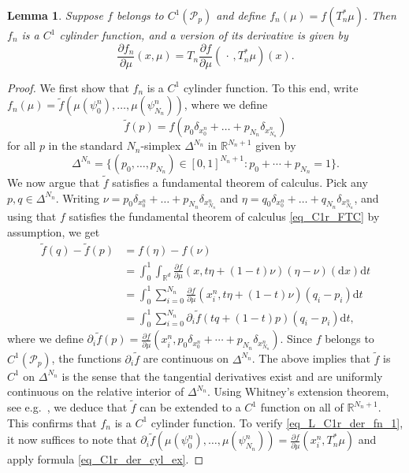 \documentclass{article}
\newtheorem{lemma}[theorem]{Lemma}
\theoremstyle{definition}
\numberwithin{equation}{section}
\numberwithin{theorem}{section}
\newcommand{\R}{\mathbb{R}}
\newcommand{\dx}{\mathrm{d}x}
\newcommand{\dt}{\mathrm{d}t}
\newcommand{\Pcal}{{\mathcal P}}
\newcommand{\fdot}{{\,\cdot\,}}
\begin{document}
\begin{lemma}\label{L_C1r_der_fn}
Suppose $f$ belongs to $C^1(\Pcal_p)$ and define $f_n(\mu)=f(T_n^*\mu)$. Then $f_n$ is a $C^1$ cylinder function, and a version of its derivative is given by
\begin{equation}\label{eq_L_C1r_der_fn_1}
\frac{\partial f_n}{\partial\mu}(x,\mu) = T_n \frac{\partial f}{\partial\mu}(\fdot,T_n^*\mu)(x).
\end{equation}
\end{lemma}

\begin{proof}
We first show that $f_n$ is a $C^1$ cylinder function. To this end, write $f_n(\mu) = \tilde f(\mu(\psi^n_0),\ldots,\mu(\psi^n_{N_n}))$, where we define
\begin{equation}\label{eq_L_C1r_der_fn_ftilde}
\tilde f(p) = f(p_0\delta_{x^n_0} + \ldots + p_{N_n}\delta_{x^n_{N_n}})
\end{equation}
for all $p$ in the standard $N_n$-simplex $\Delta^{N_n}$ in $\R^{N_n+1}$ given by
\begin{equation}
\Delta^{N_n} = \{(p_0,\ldots,p_{N_n}) \in [0,1]^{N_n+1}\colon p_0+\cdots+p_{N_n}=1\}.
\end{equation}
We now argue that $\tilde f$ satisfies a fundamental theorem of calculus. Pick any $p,q\in\Delta^{N_n}$. Writing $\nu=p_0\delta_{x^n_0} + \ldots + p_{N_n}\delta_{x^n_{N_n}}$ and $\eta=q_0\delta_{x^n_0} + \ldots + q_{N_n}\delta_{x^n_{N_n}}$, and using that $f$ satisfies the fundamental theorem of calculus \eqref{eq_C1r_FTC} by assumption, we get
\begin{align*}
\tilde f(q)-\tilde f(p) &= f(\eta) - f(\nu) \\
&= \int_0^1 \int_{\R^d} \frac{\partial f}{\partial\mu}(x,t\eta + (1-t)\nu)(\eta-\nu)(\dx)\dt \label{eq_L_C1r_der_fn_2} \\
&= \int_0^1 \sum_{i=0}^{N_n}  \frac{\partial f}{\partial\mu}(x^n_i,t\eta + (1-t)\nu)(q_i-p_i)\dt \\
&= \int_0^1 \sum_{i=0}^{N_n} \partial_i\tilde f(tq+(1-t)p)(q_i-p_i)\dt,
\end{align*}
where we define $\partial_i\tilde f(p)=\frac{\partial f}{\partial\mu}(x^n_i,p_0\delta_{x^n_0}+\cdots+p_{N_n}\delta_{x^n_{N_n}})$. Since $f$ belongs to $C^1(\Pcal_p)$, the functions $\partial_i\tilde f$ are continuous on $\Delta^{N_n}$.
The above implies that $\tilde f$ is $C^1$ on $\Delta^{N_n}$ is the sense that the tangential derivatives exist and are uniformly continuous on the relative interior of $\Delta^{N_n}$. Using Whitney's extension theorem, see e.g.\ \citep[Appendix, Corollary~6.3]{MR838085}, we deduce that $\tilde f$ can be extended to a $C^1$ function on all of $\R^{N_n+1}$.
This confirms that $f_n$ is a $C^1$ cylinder function. To verify \eqref{eq_L_C1r_der_fn_1}, it now suffices to note that $\partial_i\tilde f(\mu(\psi^n_0),\ldots,\mu(\psi^n_{N_n}))=\frac{\partial f}{\partial\mu}(x^n_i,T_n^*\mu)$ and apply formula \eqref{eq_C1r_der_cyl_ex}.
\end{proof}
\end{document}
